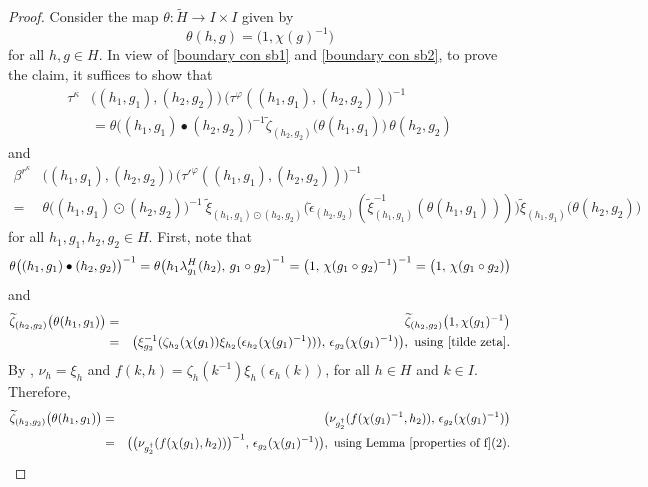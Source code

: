 \documentclass{jonasart}
\theoremstyle{plain}
\begin{document}
\begin{proof}
		Consider the map $\theta:\widetilde{H}\to I\times I$ given by
		$$\theta(h,g)= \big(1,\chi(g)^{-1} \big)$$
		for all $h, g \in H$. In view of \eqref{boundary con sb1} and \eqref{boundary con sb2}, to prove the claim, it suffices to show that
		\begin{align*}
			\tau^\kappa & \big((h_1,g_1),(h_2,g_2)\big) \, \big(\tau^\varphi((h_1,g_1),(h_2,g_2))\big)^{-1} \\
			&= \theta \big((h_1,g_1)\bullet(h_2,g_2)\big)^{-1} \widetilde{\zeta}_{(h_2,g_2)} \big(\theta(h_1,g_1)\big)\,\theta(h_2,g_2)
		\end{align*}
		and
		\begin{align*}
			\beta^{r^\kappa}&\big((h_1,g_1),(h_2,g_2) \big)\,  \big(\tau'^\varphi((h_1,g_1),(h_2,g_2)) \big)^{-1} \\
			={ }&{ }\theta \big((h_1,g_1)\odot(h_2,g_2)\big)^{-1} ~ \widetilde{\xi}_{(h_1,g_1)\odot(h_2,g_2)} \big(\widetilde{\epsilon}_{(h_2,g_2)}(\widetilde{\xi}^{-1}_{(h_1,g_1)}(\theta(h_1,g_1)))\big) \widetilde{\xi}_{(h_1,g_1)}\big(\theta(h_2,g_2)\big)
		\end{align*}
		for all $h_1,g_1,h_2,g_2 \in H$.  First, note that
		$$	\theta \big((h_1,g_1)\bullet(h_2,g_2) \big)^{-1}= \theta \big(h_1\lambda^H_{g_1}(h_2),\, g_1\circ g_2 \big)^{-1}= \big(1, \,\chi(g_1\circ g_2)^{-1}\big)^{-1} \nonumber\\
		= \big(1, \,\chi(g_1\circ g_2)\big)\nonumber
		$$
		and
		\begin{eqnarray*}
			\widetilde{\zeta}_{(h_2,g_2)} \big(\theta(h_1,g_1)\big)&=& \widetilde{\zeta}_{(h_2,g_2)} \big(1,\chi(g_1)^{-1}\big)\\
			&=&\big(\xi^{-1}_{g_2}(\zeta_{h_2}(\chi(g_1))\xi_{h_2}(\epsilon_{h_2}(\chi(g_1)^{-1}))), \, \epsilon_{g_2}(\chi(g_1)^{-1})\big), \text{ using \eqref{tilde zeta}.}
		\end{eqnarray*}
		By  \cite[Corollary 4.2 and Proposition 4.3]{MR4819014}, $\nu_h=\xi_h$ and $f(k,h)=\zeta_h(k^{-1})\xi_h(\epsilon_h(k))$, for all $h\in H$ and $k\in I$. Therefore,
		\begin{eqnarray*}
			\widetilde{\zeta}_{(h_2,g_2)} \big(\theta(h_1,g_1)\big)&=& \big(\nu_{g_2^\dagger}(f(\chi(g_1)^{-1},h_2)), \, \epsilon_{g_2}(\chi(g_1)^{-1}) \big)\\
			&=&\big(\big(\nu_{g_2^\dagger}(f(\chi(g_1),h_2))\big)^{-1}, \, \epsilon_{g_2}(\chi(g_1)^{-1})\big), ~\text{using Lemma \eqref{properties of f}(2).}
		\end{eqnarray*}
		

\end{proof}
\end{document}

